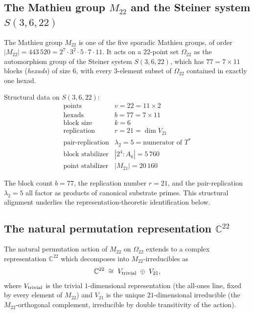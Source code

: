 \documentclass[11pt,reqno]{amsart}
\theoremstyle{plain}
\theoremstyle{definition}
\theoremstyle{remark}
\newcommand{\Mtwentytwo}{M_{22}}
\newcommand{\Vtriv}{V_{\rm trivial}}
\newcommand{\Vtwentyone}{V_{21}}
\newcommand{\Tstar}{T^*}
\begin{document}

\subsection{The Mathieu group $\Mtwentytwo$ and the Steiner system $S(3,6,22)$}

The Mathieu group $\Mtwentytwo$ is one of the five sporadic Mathieu
groups, of order $|\Mtwentytwo| = 443\,520 = 2^7 \cdot 3^2 \cdot 5 \cdot
7 \cdot 11$. It acts on a $22$-point set $\Omega_{22}$ as the
automorphism group of the Steiner system $S(3, 6, 22)$, which has
$77 = 7 \times 11$ blocks (\emph{hexads}) of size $6$, with every
$3$-element subset of $\Omega_{22}$ contained in exactly one hexad.

Structural data on $S(3, 6, 22)$:
\begin{equation*}
\begin{array}{ll}
\text{points} & v = 22 = 11 \times 2 \\
\text{hexads} & b = 77 = 7 \times 11 \\
\text{block size} & k = 6 \\
\text{replication} & r = 21 = \dim \Vtwentyone \\
\text{pair-replication} & \lambda_2 = 5 = \text{numerator of }\Tstar \\
\text{block stabilizer} & |2^4{:}A_6| = 5\,760 \\
\text{point stabilizer} & |M_{21}| = 20\,160
\end{array}
\end{equation*}

The block count $b = 77$, the replication number $r = 21$, and the
pair-replication $\lambda_2 = 5$ all factor as products of canonical
substrate primes. This structural alignment underlies the
representation-theoretic identification below.

\subsection{The natural permutation representation $\mathbb{C}^{22}$}


The natural permutation action of $\Mtwentytwo$ on $\Omega_{22}$
extends to a complex representation $\mathbb{C}^{22}$ which decomposes
into $\Mtwentytwo$-irreducibles as
\begin{equation}\label{eq:V22-decomp}
\mathbb{C}^{22} \;\cong\; \Vtriv \;\oplus\; \Vtwentyone,
\end{equation}
where $\Vtriv$ is the trivial $1$-dimensional representation (the
all-ones line, fixed by every element of $\Mtwentytwo$) and
$\Vtwentyone$ is the unique $21$-dimensional irreducible (the
$\Mtwentytwo$-orthogonal complement, irreducible by double
transitivity of the action).
\end{document}
